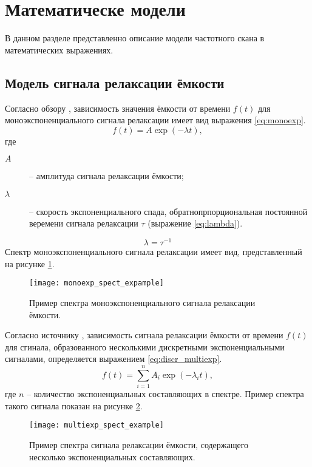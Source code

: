 \section{Математическе модели}

    В данном разделе представленно описание модели частотного скана 
    в математических выражениях.


    \subsection{Модель сигнала релаксации ёмкости}

    Согласно обзору \cite{istratov_exp_analysis}, зависимость значения
    ёмкости от времени $f(t)$ для моноэкспоненциального сигнала релаксации
    имеет вид выражения \ref{eq:monoexp}.
    \begin{equation}
        \label{eq:monoexp}
        f(t) = A \exp \left(-\lambda t\right) ,
    \end{equation}
    где
    \begin{description}
        \item[\(A\)] -- амплитуда сигнала релаксации ёмкости;
        \item[\(\lambda\)] -- скорость экспоненциального спада,
        обратнопрпорциональная постоянной веремени сигнала релаксации
        $\tau$ (выражение \ref{eq:lambda}).
    \end{description}
    \begin{equation}
        \label{eq:lambda}
        \lambda = \tau ^ {-1}
    \end{equation}
    Спектр моноэкспоненциального сигнала релаксации имеет вид, 
    представленный на рисунке \ref{pic:monoexp_spect_example}.
    \begin{figure}[ht]
        \centering
        \texttt{[image: monoexp\_spect\_expample]}
        \caption{Пример спектра моноэкспоненциального сигнала релаксации
        ёмкости.}
        \label{pic:monoexp_spect_example}
    \end{figure}

    Согласно источнику \cite{istratov_exp_analysis}, зависимость сигнала 
    релаксации ёмкости от времени $f(t)$ для сгинала, образованного 
    несколькими дискретными экспоненциальными сигналами, определяется 
    выражением 
    \ref{eq:discr_multiexp}.
    \begin{equation}
        \label{eq:discr_multiexp}
        f(t) = \sum_{i=1}^{n}A_i\exp\left(-\lambda_i t\right) ,
    \end{equation}
    где $n$ -- количество экспоненциальных составляющих в спектре.
    Пример спектра такого сигнала показан на рисунке 
    \ref{pic:multiexp_spect_example}.
    \begin{figure}[ht]
        \centering
        \texttt{[image: multiexp\_spect\_example]}
        \caption{Пример спектра сигнала релаксации ёмкости, содержащего
        несколько экспоненциальных составляющих.}
        \label{pic:multiexp_spect_example}
    \end{figure}


